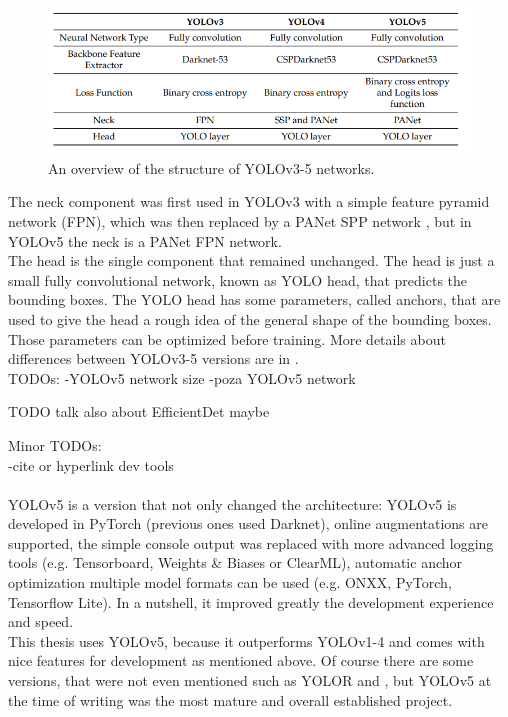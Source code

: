 \begin{figure}
\includegraphics[width=\textwidth]{images/yolo_images/yolo_compare}
\caption{An overview of the structure of YOLOv3-5 networks.}
\end{figure}

The neck component was first used in YOLOv3 with a simple feature pyramid network (FPN), which was then replaced by a PANet SPP network \cite{panet_paper, spp_paper}, but in YOLOv5 the neck is a PANet FPN network. \\
The head is the single component that remained unchanged. The head is just a small fully convolutional network, known as YOLO head, that predicts the bounding boxes. The YOLO head has some parameters, called anchors, that are used to give the head a rough idea of the general shape of the bounding boxes. Those parameters can be optimized before training.  More details about differences between YOLOv3-5 versions are in \cite{yolo_compare}.\\

TODOs:
-YOLOv5 network size
-poza YOLOv5 network

TODO talk also about EfficientDet maybe

Minor TODOs:\\
-cite or hyperlink dev tools \\
\\
YOLOv5 is a version that not only changed the architecture: YOLOv5 is developed in PyTorch (previous ones used Darknet), online augmentations are supported, the simple console output was replaced with more advanced logging tools (e.g. Tensorboard, Weights \& Biases or ClearML), automatic anchor optimization multiple model formats can be used (e.g. ONXX, PyTorch, Tensorflow Lite). In a nutshell, it improved greatly the development experience and speed. \\
This thesis uses YOLOv5, because it outperforms YOLOv1-4 \cite{yolovx_paper} and comes with nice features for development as mentioned above. Of course there are some versions, that were not even mentioned such as YOLOR \cite{yolor_paper} and \cite{yolovx_paper}, but YOLOv5 at the time of writing was the most mature and overall established project. \\


